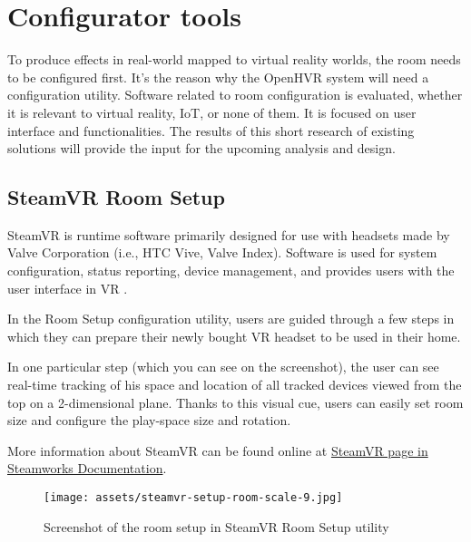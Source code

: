 \hypertarget{x-configurator-tools}{\section{Configurator tools}}
To produce effects in real-world mapped to virtual reality worlds,
the room needs to be configured first.
It’s the reason why the OpenHVR system will need a configuration utility.
Software related to room configuration is evaluated, whether it is relevant
to virtual reality, IoT, or none of them. It is focused on user interface and functionalities.
The results of this short research of existing solutions
will provide the input for the upcoming analysis and design.


\hypertarget{x-steamvr-room-setup}{\subsection{SteamVR Room Setup}}
SteamVR is runtime software primarily designed for use with headsets made
by Valve Corporation (i.e., HTC Vive, Valve Index). Software is used for
system configuration, status reporting, device management, and provides users
with the user interface in VR \cite{steamvr}.


In the Room Setup configuration utility, users are guided through a few steps
in which they can prepare their newly bought VR headset to be used in their
home.


In one particular step (which you can see on the screenshot), the user can see
real-time tracking of his space and location of all tracked devices viewed
from the top on a 2-dimensional plane. Thanks to this visual cue, users can
easily set room size and configure the play-space size and rotation.


More information about SteamVR can be found online at
\href{https://partner.steamgames.com/doc/features/steamvr/info}{SteamVR page in Steamworks Documentation}.

\begin{figure}[h]{}
\centering\texttt{[image: assets/steamvr-setup-room-scale-9.jpg]}
\caption{Screenshot of the room setup in SteamVR Room Setup utility}
\end{figure}

